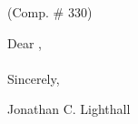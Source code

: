 \clearpage
\pagestyle{empty}
\nameaddress{\homeaddress}
\vspace*{1.0\baselineskip}%

\vspace*{2.0\baselineskip}%
\recip{} (Comp. \# 330)\\
\recipaddress{}
\vspace*{2.0\baselineskip}%

Dear \recip,\\

\\

Sincerely, 

\vspace*{2.0\baselineskip}%

Jonathan C. Lighthall